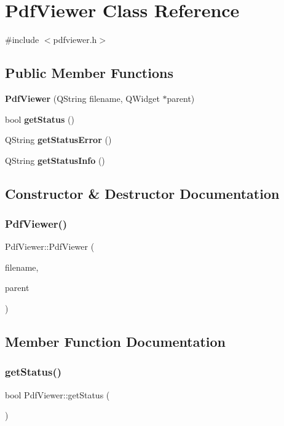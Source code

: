 \section{Pdf\+Viewer Class Reference}
\label{class_pdf_viewer}


{\ttfamily \#include $<$pdfviewer.\+h$>$}

\subsection*{Public Member Functions}
\begin{DoxyCompactItemize}
\item 
\textbf{ Pdf\+Viewer} (Q\+String filename, Q\+Widget $\ast$parent)
\item 
bool \textbf{ get\+Status} ()
\item 
Q\+String \textbf{ get\+Status\+Error} ()
\item 
Q\+String \textbf{ get\+Status\+Info} ()
\end{DoxyCompactItemize}


\subsection{Constructor \& Destructor Documentation}
\mbox{\label{class_pdf_viewer_a8a9b88ff218d7041e023471ac2d3b9c3}} 
\subsubsection{Pdf\+Viewer()}
{\footnotesize\ttfamily Pdf\+Viewer\+::\+Pdf\+Viewer (\begin{DoxyParamCaption}\item[{Q\+String}]{filename,  }\item[{Q\+Widget $\ast$}]{parent }\end{DoxyParamCaption})}



\subsection{Member Function Documentation}
\mbox{\label{class_pdf_viewer_ab8676e415c62ca8d074f9dfa01b8ba0f}} 
\subsubsection{get\+Status()}
{\footnotesize\ttfamily bool Pdf\+Viewer\+::get\+Status (\begin{DoxyParamCaption}{ }\end{DoxyParamCaption})}

